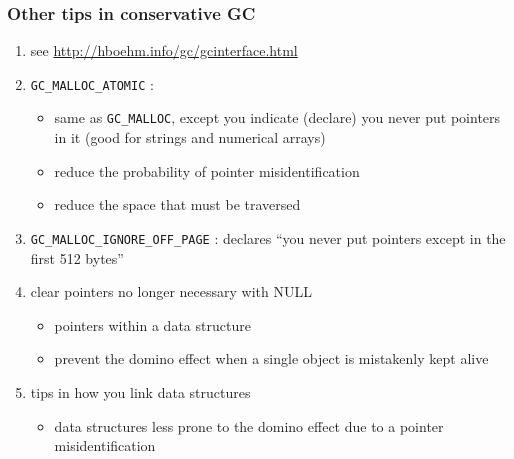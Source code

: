 \documentclass[11pt,dvipdfmx]{beamer}
\newcommand{\ao}[1]{{\color{blue}#1}}
\begin{document}
\begin{frame}
\frametitle{Other tips in conservative GC}
\begin{enumerate}
\item see \url{http://hboehm.info/gc/gcinterface.html}
\item \ao{\tt GC\_MALLOC\_ATOMIC} : 
  \begin{itemize}
  \item same as \ao{\tt GC\_MALLOC}, except you indicate (declare)
    you never put pointers in it (good for strings and numerical arrays)
  \item reduce the probability of pointer misidentification
  \item reduce the space that must be traversed 
  \end{itemize}
\item \ao{\tt GC\_MALLOC\_IGNORE\_OFF\_PAGE} :
  declares ``you never put pointers except in the first 512 bytes''
  
\item clear pointers no longer necessary with NULL
  \begin{itemize}
  \item pointers within a data structure
  \item prevent the domino effect
    when a single object is mistakenly kept alive
  \end{itemize}

\item tips in how you link data structures
  \begin{itemize}
  \item data structures less prone to the domino effect
    due to a pointer misidentification
  \end{itemize}
\end{enumerate}
\end{frame}
\fi
\end{document}
